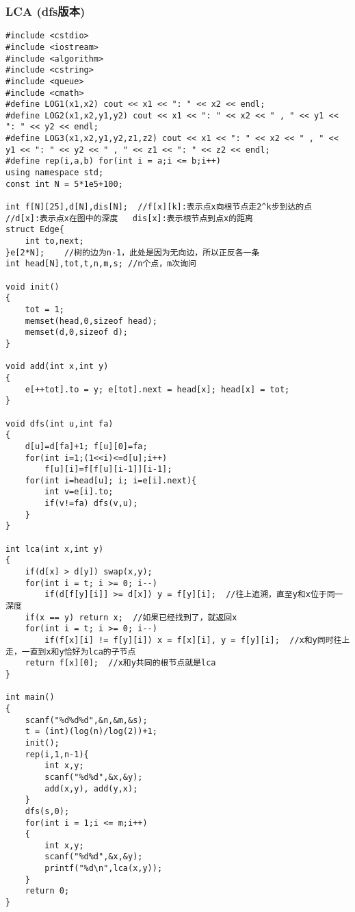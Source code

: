 \documentclass[twoside]{article}
\begin{document}
\subsubsection{LCA (dfs版本)}
\begin{lstlisting}
#include <cstdio>
#include <iostream>
#include <algorithm>
#include <cstring>
#include <queue>
#include <cmath>
#define LOG1(x1,x2) cout << x1 << ": " << x2 << endl;
#define LOG2(x1,x2,y1,y2) cout << x1 << ": " << x2 << " , " << y1 << ": " << y2 << endl;
#define LOG3(x1,x2,y1,y2,z1,z2) cout << x1 << ": " << x2 << " , " << y1 << ": " << y2 << " , " << z1 << ": " << z2 << endl;
#define rep(i,a,b) for(int i = a;i <= b;i++)
using namespace std;
const int N = 5*1e5+100;

int f[N][25],d[N],dis[N];  //f[x][k]:表示点x向根节点走2^k步到达的点
//d[x]:表示点x在图中的深度	dis[x]:表示根节点到点x的距离
struct Edge{
	int to,next;
}e[2*N];	//树的边为n-1，此处是因为无向边，所以正反各一条
int head[N],tot,t,n,m,s; //n个点，m次询问

void init()
{
	tot = 1;
	memset(head,0,sizeof head);
	memset(d,0,sizeof d);
}

void add(int x,int y)
{
	e[++tot].to = y; e[tot].next = head[x]; head[x] = tot;
}

void dfs(int u,int fa)
{
    d[u]=d[fa]+1; f[u][0]=fa;
    for(int i=1;(1<<i)<=d[u];i++)
        f[u][i]=f[f[u][i-1]][i-1];
    for(int i=head[u]; i; i=e[i].next){
        int v=e[i].to;
        if(v!=fa) dfs(v,u);
    }
}    

int lca(int x,int y)
{
	if(d[x] > d[y]) swap(x,y);
	for(int i = t; i >= 0; i--)
		if(d[f[y][i]] >= d[x]) y = f[y][i];  //往上追溯，直至y和x位于同一深度
	if(x == y) return x;  //如果已经找到了，就返回x
	for(int i = t; i >= 0; i--)
		if(f[x][i] != f[y][i]) x = f[x][i], y = f[y][i];  //x和y同时往上走，一直到x和y恰好为lca的子节点
	return f[x][0];  //x和y共同的根节点就是lca 
}

int main()
{
	scanf("%d%d%d",&n,&m,&s);
	t = (int)(log(n)/log(2))+1;
	init();
	rep(i,1,n-1){
		int x,y;
		scanf("%d%d",&x,&y);
		add(x,y), add(y,x);
	}
	dfs(s,0);
	for(int i = 1;i <= m;i++)
	{
		int x,y;
		scanf("%d%d",&x,&y);
		printf("%d\n",lca(x,y));
	}
	return 0;
}\end{lstlisting}
\end{document}
